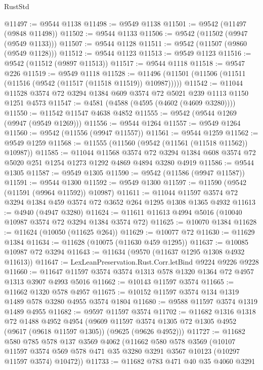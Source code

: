 \begin{lexlean}{RustStd}
\begin{coremodule}
{\begin{coremodule}
{{{{{{{{{{{{{{{{{{{{{{{{{{{{{{{{{@11497 := @9544 @1138
@11498 := @9549 @1138
@11501 := @9542 (@11497 (@9848 @11498))
@11502 := @9544 @1133
@11506 := @9542 (@11502 (@9947 (@9549 @1133)))
@11507 := @9544 @1128
@11511 := @9542 (@11507 (@9860 (@9549 @1128)))
@11512 := @9544 @1123
@11513 := @9549 @1123
@11516 := @9542 (@11512 (@9897 @11513))
@11517 := @9544 @1118
@11518 := @9547 @226
@11519 := @9549 @1118
@11528 := @11496 (@11501 (@11506 (@11511 (@11516 (@9542 (@11517 (@11518 @11519)) @10987)))))
@11542 := @11044 @11528 @3574 @72 @3294 @1384 @609 @3574 @72 @5021 @239 @1113 @1150 @1251 @4573
@11547 := @4581 (@4588 (@4595 (@4602 (@4609 @3280))))
@11550 := @11542 @11547 @4638 @4852
@11555 := @9542 (@9544 @1269 (@9947 (@9549 @1269)))
@11556 := @9544 @1264
@11557 := @9549 @1264
@11560 := @9542 (@11556 (@9947 @11557))
@11561 := @9544 @1259
@11562 := @9549 @1259
@11568 := @11555 (@11560 (@9542 (@11561 (@11518 @11562)) @10987))
@11585 := @11044
    @11568
    @3574
    @72
    @3294
    @1384
    @608
    @3574
    @72
    @5020
    @251
    @1254
    @1273
    @1292
    @4869
    @4894
    @3280
    @4919
@11586 := @9544 @1305
@11587 := @9549 @1305
@11590 := @9542 (@11586 (@9947 @11587))
@11591 := @9544 @1300
@11592 := @9549 @1300
@11597 := @11590 (@9542 (@11591 (@9964 @11592)) @10987)
@11611 := @11044 @11597 @3574 @72 @3294 @1384 @459 @3574 @72 @3652 @264 @1295 @1308 @1365 @4932
@11613 := @4940 (@4947 @3280)
@11624 := @11611 @11613 @4994 @5016 (@10040 @10987 @3574 @72 @3294 @1384 @3574 @72)
@11625 := @10070 @1384
@11628 := @11624 (@10050 (@11625 @264))
@11629 := @10077 @72
@11630 := @11629 @1384
@11634 := @11628 (@10075 (@11630 @459 @1295))
@11637 := @10085 @10987 @72 @3294
@11643 := @11634 (@9570 (@11637 @1295 @1308 @4932 @11613))
@11647 := LexLeanPreservation.Rust.Corr.letBind @9224 @9226 @9228
@11660 := @11647 @11597 @3574 @3574 @1313 @578 @1320 @1364 @72 @4957 @1313 @3907 @4993 @5016
@11662 := @10143 @11597 @3574
@11665 := @11662 @1320 @578 @4957
@11675 := @10152 @11597 @3574 @134 @1319 @1489 @578 @3280 @4955 @3574 @1804
@11680 := @9588 @11597 @3574 @1319 @1489 @4955
@11682 := @9597 @11597 @3574
@11702 := @11682
    @1316
    @1318
    @72
    @1488
    @4952
    @4954
    (@9609 @11597 @3574 @1305 @72 @1305 @4952 (@9617 (@9618 @11597 @1305)) (@9625 (@9626 @4952)))
@11727 := @11682
    @580
    @785
    @578
    @137
    @3569
    @4062
    (@11662
      @580
      @578
      @3569
      (@10107
        @11597
        @3574
        @569
        @578
        @471
        @35
        @3280
        @3291
        @3567
        @10123
        (@10297 @11597 @3574)
        @10472))
@11733 := @11682 @783 @471 @40 @35 @4060 @3291
}}}}}}}}}}}}}}}}}}}}}}}}}}}}}}}}}
\end{coremodule}}
\end{coremodule}
\end{lexlean}

